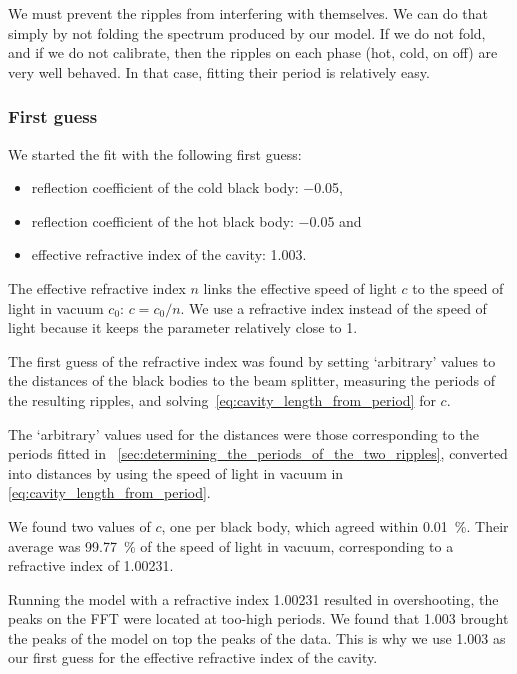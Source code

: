 We must prevent the ripples from interfering with themselves.
We can do that simply by not folding the spectrum produced by our model.
If we do not fold, and if we do not calibrate, then the ripples on each phase (hot, cold, on off) are very well behaved.
In that case, fitting their period is relatively easy.

\subsubsection{First guess}

We started the fit with the following first guess:
\begin{itemize}
    \item reflection coefficient of the cold black body: \num{-0.05},
    \item reflection coefficient of the hot black body: \num{-0.05} and
    \item effective refractive index of the cavity: \num{1.003}.
\end{itemize}

The effective refractive index $n$ links the effective speed of light $c$ to the speed of light in vacuum $c_0$: $c = c_0 / n$.
We use a refractive index instead of the speed of light because it keeps the parameter relatively close to 1.

The first guess of the refractive index was found by setting `arbitrary' values to the distances of the black bodies to the beam splitter, measuring the periods of the resulting ripples, and solving~\cref{eq:cavity_length_from_period} for $c$.

The `arbitrary' values used for the distances were those corresponding to the periods fitted in~%
\cref{sec:determining_the_periods_of_the_two_ripples},
converted into distances by using the speed of light in vacuum in~%
\cref{eq:cavity_length_from_period}.

We found two values of $c$, one per black body, which agreed within \SI{0.01}{\percent}.
Their average was \SI{99.77}{\percent} of the speed of light in vacuum,
corresponding to a refractive index of \num{1.00231}.

Running the model with a refractive index \num{1.00231} resulted in overshooting, the peaks on the FFT were located at too-high periods.
We found that \num{1.003} brought the peaks of the model on top the peaks of the data.
This is why we use \num{1.003} as our first guess for the effective refractive index of the cavity.

